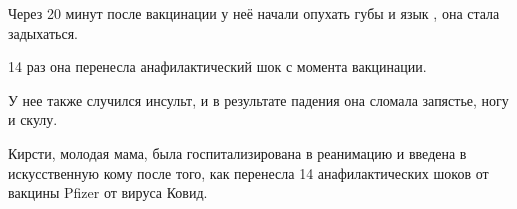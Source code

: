 Через 20 минут после вакцинации у неё начали опухать губы и язык , она стала
задыхаться.

14 раз она перенесла анафилактический шок с момента вакцинации.

У нее также случился инсульт, и в результате падения она сломала запястье, ногу
и скулу.

Кирсти, молодая мама, была госпитализирована в реанимацию и введена в
искусственную кому после того, как перенесла 14 анафилактических шоков от
вакцины Pfizer от вируса Ковид.
